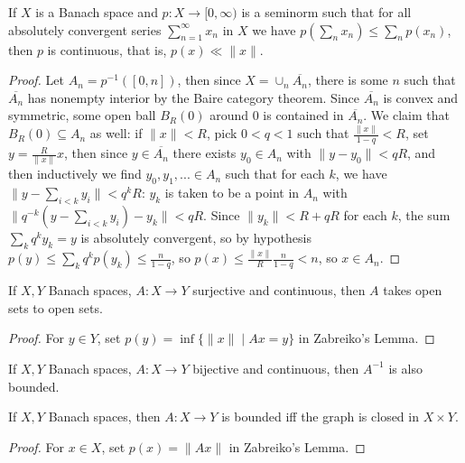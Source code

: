 \begin{lem} If $X$ is a Banach space and $p : X \rightarrow [0,\infty)$ is a seminorm such that for all absolutely convergent series $\sum_{n=1}^\infty x_n$ in $X$ we have $p(\sum_n x_n) \le \sum_n p(x_n)$, then $p$ is continuous, that is, $p(x) \ll \|x\|$.
\end{lem}
\begin{proof} Let $A_n = p^{-1}([0,n])$, then since $X = \cup_n \overline{A_n}$, there is some $n$ such that $\overline{A_n}$ has nonempty interior by the Baire category theorem. Since $\overline{A_n}$ is convex and symmetric, some open ball $B_R(0)$ around $0$ is contained in $\overline{A_n}$. We claim that $B_R(0) \subseteq A_n$ as well: if $\|x\| < R$, pick $0 < q < 1$ such that $\frac{\|x\|}{1-q} < R$, set $y = \frac{R}{\|x\|}x$, then since $y \in \overline{A_n}$ there exists $y_0 \in A_n$ with $\|y - y_0\| < qR$, and then inductively we find $y_0, y_1, ... \in A_n$ such that for each $k$, we have $\|y - \sum_{i<k} y_i\| < q^kR$: $y_k$ is taken to be a point in $A_n$ with $\|q^{-k}(y - \sum_{i<k} y_i) - y_k\| < qR$. Since $\|y_k\| < R + qR$ for each $k$, the sum $\sum_k q^k y_k = y$ is absolutely convergent, so by hypothesis $p(y) \le \sum_k q^kp(y_k) \le \frac{n}{1-q}$, so $p(x) \le \frac{\|x\|}{R}\frac{n}{1-q} < n$, so $x \in A_n$.
\end{proof}

\begin{thm} If $X,Y$ Banach spaces, $A:X\rightarrow Y$ surjective and continuous, then $A$ takes open sets to open sets.
\end{thm}
\begin{proof} For $y \in Y$, set $p(y) = \inf \{\|x\| \mid Ax = y\}$ in Zabreiko's Lemma.
\end{proof}

\begin{thm} If $X,Y$ Banach spaces, $A:X\rightarrow Y$ bijective and continuous, then $A^{-1}$ is also bounded.
\end{thm}

\begin{thm} If $X, Y$ Banach spaces, then $A:X\rightarrow Y$ is bounded iff the graph is closed in $X\times Y$.
\end{thm}
\begin{proof} For $x \in X$, set $p(x) = \|Ax\|$ in Zabreiko's Lemma.
\end{proof}


